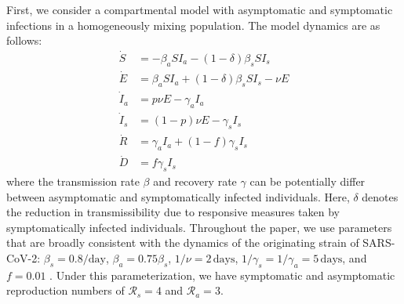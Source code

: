 \documentclass[12pt]{article}
\newcommand{\RR}{\ensuremath{{\mathcal R}}\xspace}
\begin{document}
First, we consider a compartmental model with asymptomatic and symptomatic infections in a homogeneously mixing population.
The model dynamics are as follows:
\begin{align}
\dot{S} &= -\beta_a S I_a -(1-\delta) \beta_s S I_s \\
\dot{E} &= \beta_a S I_a + (1-\delta) \beta_s S I_s - \nu E\\
\dot{I}_a &= p \nu E - \gamma_a I_a\\
\dot{I}_s &= (1-p) \nu E -\gamma_s I_s\\
\dot{R} &= \gamma_a I_a + (1-f) \gamma_s I_s \\
\dot{D} &= f \gamma_s I_s
\end{align}
where the transmission rate $\beta$ and recovery rate $\gamma$ can be potentially differ between asymptomatic and symptomatically infected individuals.  
Here, $\delta$ denotes the reduction in transmissibility due to responsive measures taken by symptomatically infected individuals.
Throughout the paper, we use parameters that are broadly consistent with the dynamics of the originating strain of SARS-CoV-2: $\beta_s = 0.8/\mathrm{day}$, $\beta_a = 0.75 \beta_s$, $1/\nu=2\,\mathrm{days}$, $1/\gamma_s=1/\gamma_a=5\,\mathrm{days}$, and $f=0.01$ \citep{park2020reconciling}.
Under this parameterization, we have symptomatic and asymptomatic reproduction numbers of $\RR_s = 4$ and $\RR_a = 3$.
\end{document}
